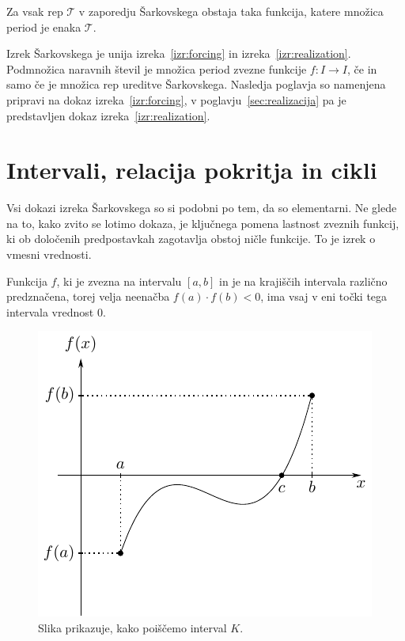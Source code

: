 \documentclass[mat2]{fmfdelo}
\begin{document}
\begin{izrek}\label{izr:realization}
Za vsak rep $\mathcal{T}$ v zaporedju Šarkovskega obstaja taka funkcija, katere množica period je enaka $\mathcal{T}$.
\end{izrek}

Izrek Šarkovskega je unija izreka~\ref{izr:forcing} in izreka~\ref{izr:realization}. Podmnožica naravnih števil je množica period zvezne funkcije $f:I \to I$, če in samo če je množica rep ureditve Šarkovskega. Nasledja poglavja so namenjena pripravi na dokaz izreka~\ref{izr:forcing}, v poglavju~\ref{sec:realizacija} pa je predstavljen dokaz izreka~\ref{izr:realization}.
\section{Intervali, relacija pokritja in cikli}
Vsi dokazi izreka Šarkovskega so si podobni po tem, da so elementarni. Ne glede na to, kako zvito se lotimo dokaza, je ključnega pomena lastnost zveznih funkcij, ki ob določenih predpostavkah zagotavlja obstoj ničle funkcije. To je izrek o vmesni vrednosti.

\begin{izrek}\label{izr:iovv}
Funkcija $f$, ki je zvezna na intervalu $[a, b]$ in je na krajiščih intervala različno predznačena, torej velja neenačba $f(a)\cdot f(b) < 0$, ima vsaj v eni točki tega intervala vrednost 0.
\end{izrek}

\begin{figure}[h]
  \centering
  \includegraphics[]{images/intermediate.pdf}
  \caption[Primer vektorske slike.]{Slika prikazuje, kako poiščemo interval $K$.}
  \label{fig:bezje}
\end{figure}
\end{document}
